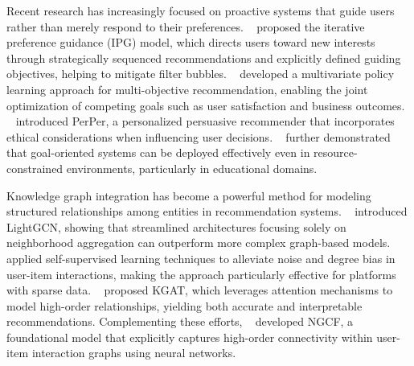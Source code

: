 Recent research has increasingly focused on proactive systems that guide users rather than merely respond to their preferences. \citeauthor{bi2024proactive}~\cite{bi2024proactive} proposed the iterative preference guidance (IPG) model, which directs users toward new interests through strategically sequenced recommendations and explicitly defined guiding objectives, helping to mitigate filter bubbles. \citeauthor{jeunen2024multi}~\cite{jeunen2024multi} developed a multivariate policy learning approach for multi-objective recommendation, enabling the joint optimization of competing goals such as user satisfaction and business outcomes. \citeauthor{alslaity2019towards}~\cite{alslaity2019towards} introduced PerPer, a personalized persuasive recommender that incorporates ethical considerations when influencing user decisions. \citeauthor{li2024multi}~\cite{li2024multi} further demonstrated that goal-oriented systems can be deployed effectively even in resource-constrained environments, particularly in educational domains.


Knowledge graph integration has become a powerful method for modeling structured relationships among entities in recommendation systems. \citeauthor{he2020lightgcn}~\cite{he2020lightgcn} introduced LightGCN, showing that streamlined architectures focusing solely on neighborhood aggregation can outperform more complex graph-based models. \citeauthor{wu2021self}~\cite{wu2021self} applied self-supervised learning techniques to alleviate noise and degree bias in user-item interactions, making the approach particularly effective for platforms with sparse data. \citeauthor{wang2019kgat}~\cite{wang2019kgat} proposed KGAT, which leverages attention mechanisms to model high-order relationships, yielding both accurate and interpretable recommendations. Complementing these efforts, \citeauthor{wang2019neural}~\cite{wang2019neural} developed NGCF, a foundational model that explicitly captures high-order connectivity within user-item interaction graphs using neural networks.



